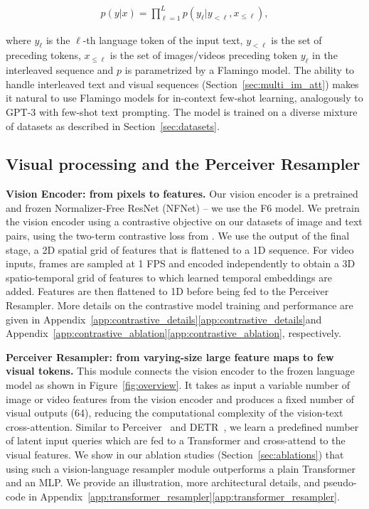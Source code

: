 \begin{align}
    p(y | x) = \prod_{\ell=1}^L p(y_\ell | y_{< \ell}, x_{\leq \ell}),
    \label{eq:modeling}
\end{align}

where $y_{\ell}$ is the $\ell$-th language token of the input text, $y_{<\ell}$ is the set of preceding tokens, $x_{\leq \ell}$ is the set of images/videos preceding token $y_{\ell}$ in the interleaved sequence and $p$ is parametrized by a Flamingo model. The ability to handle interleaved text and visual sequences (Section~\ref{sec:multi_im_att}) makes it natural to use Flamingo models for in-context few-shot learning, analogously to GPT-3 with few-shot text prompting. The model is trained on a diverse mixture of datasets as described in Section~\ref{sec:datasets}.

\subsection{Visual processing and the Perceiver Resampler}
\label{sec:transformer_resampler}

\textbf{Vision Encoder: from pixels to features.} Our vision encoder is a pretrained and frozen Normalizer-Free ResNet (NFNet) \citep{nfnets} -- we use the F6 model. We pretrain the vision encoder using a contrastive objective on our datasets of image and text pairs, using the two-term contrastive loss from \citet{clip}.
We use the output of the final stage, a 2D spatial grid of features that is flattened to a 1D sequence. For video inputs, frames are sampled at 1 FPS and encoded independently to obtain a 3D spatio-temporal grid of features to which learned temporal embeddings are added. Features are then flattened to 1D before being fed to the Perceiver Resampler. More details on the contrastive model training and performance are given in Appendix~\ifwithappendix\ref{app:contrastive_details}\else\ref*{app:contrastive_details}\fi and Appendix~\ifwithappendix\ref{app:contrastive_ablation}\else\ref*{app:contrastive_ablation}\fi, respectively.

\textbf{Perceiver Resampler: from varying-size large feature maps to few visual tokens.} This module connects the vision encoder to the frozen language model as shown in Figure~\ref{fig:overview}.
It takes as input a variable number of image or video features from the vision encoder and produces a fixed number of visual outputs (64), reducing the computational complexity of the vision-text cross-attention. Similar to Perceiver~\citep{jaegle2021perceiver} and DETR~\citep{carion2020end}, we learn a predefined number of latent input queries which are fed to a Transformer and cross-attend to the visual features. We show in our ablation studies (Section~\ref{sec:ablations}) that using such a vision-language resampler module outperforms a plain Transformer and an MLP. We provide an illustration, more architectural details, and pseudo-code in Appendix~\ifwithappendix\ref{app:transformer_resampler}\else\ref*{app:transformer_resampler}\fi.

